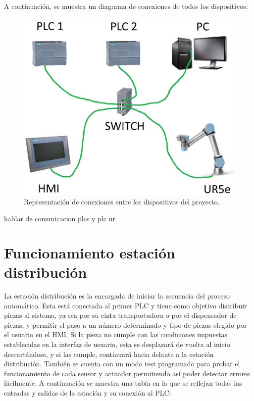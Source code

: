 A continuación, se muestra un diagrama de conexiones de todos los dispositivos:

\begin{figure} [h!]
  \begin{center}
    \includegraphics[width=15cm]{figs/conexion_dispositivos}
  \end{center}
  \caption{\centering Representación de conexiones entre los dispositivos del proyecto.}
  \label{fig:conexion_dispositivos}
\end{figure} 

hablar de comunicacion plcs y plc ur

\section{Funcionamiento estación distribución}
\label{sec:funcionamiento_distribucion}

La estación distribución es la encargada de iniciar la secuencia del proceso automático. Esta está conectada al primer PLC y tiene como objetivo distribuir piezas al sistema, ya sea por su cinta transportadora o por el dispensador de piezas, y permitir el paso a un número determinado y tipo de piezas elegido por el usuario en el HMI. Si la pieza no cumple con las condiciones impuestas establecidas en la interfaz de usuario, esta se desplazará de vuelta al inicio descartándose, y si las cumple, continuará hacia delante a la estación distribución. También se cuenta con un modo test programado para probar el funcionamiento de cada sensor y actuador permitiendo así poder detectar errores fácilmente. A continuación se muestra una tabla en la que se reflejan todas las entradas y salidas de la estación y su conexión al PLC:


